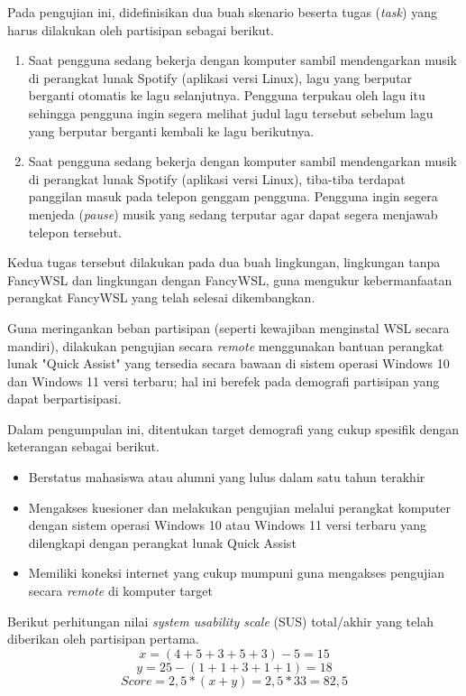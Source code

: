 Pada pengujian ini, didefinisikan dua buah skenario beserta tugas (\textit{task}) yang harus dilakukan oleh partisipan sebagai berikut.
\begin{enumerate}
    \item Saat pengguna sedang bekerja dengan komputer sambil mendengarkan musik di perangkat lunak Spotify (aplikasi versi Linux), lagu yang berputar berganti otomatis ke lagu selanjutnya. Pengguna terpukau oleh lagu itu sehingga pengguna ingin segera melihat judul lagu tersebut sebelum lagu yang berputar berganti kembali ke lagu berikutnya.
    \item Saat pengguna sedang bekerja dengan komputer sambil mendengarkan musik di perangkat lunak Spotify (aplikasi versi Linux), tiba-tiba terdapat panggilan masuk pada telepon genggam pengguna. Pengguna ingin segera menjeda (\textit{pause}) musik yang sedang terputar agar dapat segera menjawab telepon tersebut.
\end{enumerate}
Kedua tugas tersebut dilakukan pada dua buah lingkungan, lingkungan tanpa FancyWSL dan lingkungan dengan FancyWSL, guna mengukur kebermanfaatan perangkat FancyWSL yang telah selesai dikembangkan.

Guna meringankan beban partisipan (seperti kewajiban menginstal WSL secara mandiri), dilakukan pengujian secara \textit{remote} menggunakan bantuan perangkat lunak "Quick Assist" yang tersedia secara bawaan di sistem operasi Windows 10 dan Windows 11 versi terbaru; hal ini berefek pada demografi partisipan yang dapat berpartisipasi.

Dalam pengumpulan ini, ditentukan target demografi yang cukup spesifik dengan keterangan sebagai berikut.
\begin{itemize}
    \item Berstatus mahasiswa atau alumni yang lulus dalam satu tahun terakhir
    \item Mengakses kuesioner dan melakukan pengujian melalui perangkat komputer dengan sistem operasi Windows 10 atau Windows 11 versi terbaru yang dilengkapi dengan perangkat lunak Quick Assist
    \item Memiliki koneksi internet yang cukup mumpuni guna mengakses pengujian secara \textit{remote} di komputer target
\end{itemize}

Berikut perhitungan nilai \textit{system usability scale} (SUS) total/akhir yang telah diberikan oleh partisipan pertama.
\[x = (4 + 5 + 3 + 5 + 3) - 5 = 15\]
\[y = 25 - (1 + 1 + 3 + 1 + 1) = 18\]
\[Score = 2,5 * (x + y) = 2,5 * 33 = 82,5\]


